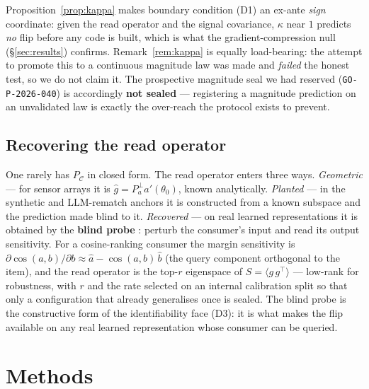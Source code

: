\documentclass[10pt]{article} %
\theoremstyle{remark}
\newcommand{\PC}{P_{\mathcal{C}}}
\newcommand{\kalign}{\kappa}
\newcommand{\seal}[1]{\texttt{GO-P-2026-#1}}
\begin{document}
Proposition~\ref{prop:kappa} makes boundary condition (D1) an ex-ante \emph{sign}
coordinate: given the read operator and the signal covariance, $\kalign$ near $1$ predicts
\emph{no} flip before any code is built, which is what the gradient-compression null
(\S\ref{sec:results}) confirms. Remark~\ref{rem:kappa} is equally load-bearing: the
attempt to promote this to a continuous magnitude law was made and \emph{failed} the
honest test, so we do not claim it. The prospective magnitude seal we had reserved
(\seal{040}) is accordingly \textbf{not sealed} --- registering a magnitude prediction on
an unvalidated law is exactly the over-reach the protocol exists to prevent.

\subsection{Recovering the read operator}\label{sec:probe}

One rarely has $\PC$ in closed form. The read operator enters three ways.
\emph{Geometric} --- for sensor arrays it is $\hat g=P_a^{\perp}a'(\theta_0)$, known
analytically. \emph{Planted} --- in the synthetic and LLM-rematch anchors it is
constructed from a known subspace and the prediction made blind to it. \emph{Recovered}
--- on real learned representations it is obtained by the \textbf{blind probe}
\citep{anon-probe}: perturb the consumer's input and read its output sensitivity. For a
cosine-ranking consumer the
margin sensitivity is $\partial\cos(a,b)/\partial b \approx \hat a-\cos(a,b)\,\hat b$
(the query component orthogonal to the item), and the read operator is the top-$r$
eigenspace of $S=\langle g\,g^\top\rangle$ --- low-rank for robustness, with $r$ and the
rate selected on an internal calibration split so that only a configuration that already
generalises once is sealed. The blind probe is the constructive form of the
identifiability face (D3): it is what makes the flip available on any real learned
representation whose consumer can be queried.

\section{Methods}\label{sec:methods}
\end{document}
